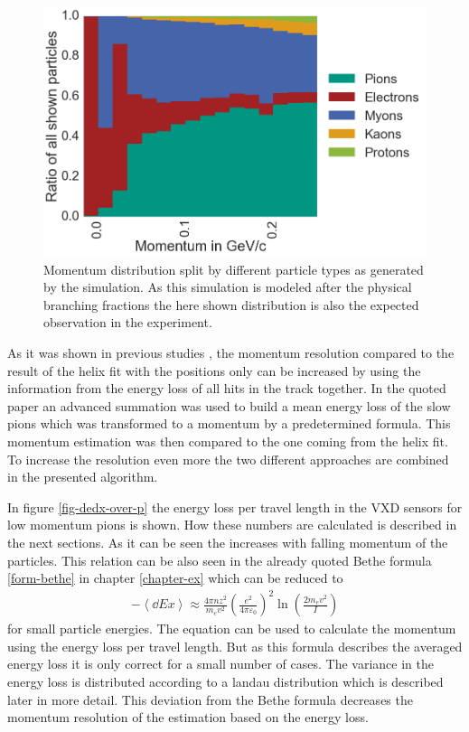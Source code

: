 \begin{figure}
 \centering
 \includegraphics[width=0.8\linewidth]{figures/vxd/momentumDistribution.png}
 \caption[Momentum distribution by different particle types.]{Momentum distribution split by different particle types as generated by the simulation. As this simulation is modeled after the physical branching fractions the here shown distribution is also the expected observation in the experiment.}
 \label{fig-particles-momentum}
\end{figure}

As it was shown in previous studies \cite{robert}, the momentum resolution compared to the result of the helix fit with the positions only can be increased by using the information from the energy loss of all hits in the track together. In the quoted paper an advanced summation was used to build a mean energy loss of the slow pions which was transformed to a momentum by a predetermined formula. This momentum estimation was then compared to the one coming from the helix fit. To increase the resolution even more the two different approaches are combined in the presented algorithm.

In figure \ref{fig-dedx-over-p} the energy loss per travel length in the VXD sensors for low momentum pions is shown. How these numbers are calculated is described in the next sections. As it can be seen the \dedx increases with falling momentum of the particles. This relation can be also seen in the already quoted Bethe formula \ref{form-bethe} in chapter \ref{chapter-ex} which can be reduced to 
\begin{align}
 -\left \langle \dd{E}{x} \right\rangle \approx \frac{4 \pi n z^2}{m_e v^2} \left( \frac{e^2}{4 \pi \varepsilon_0} \right)^2 \ln \left( \frac{2 m_e v^2}{I} \right) \label{form-bethe-simpl}
\end{align}
for small particle energies. The equation can be used to calculate the momentum using the energy loss per travel length. But as this formula describes the averaged energy loss it is only correct for a small number of cases. The variance in the energy loss is distributed according to a landau distribution which is described later in more detail. This deviation from the Bethe formula decreases the momentum resolution of the estimation based on the energy loss.

